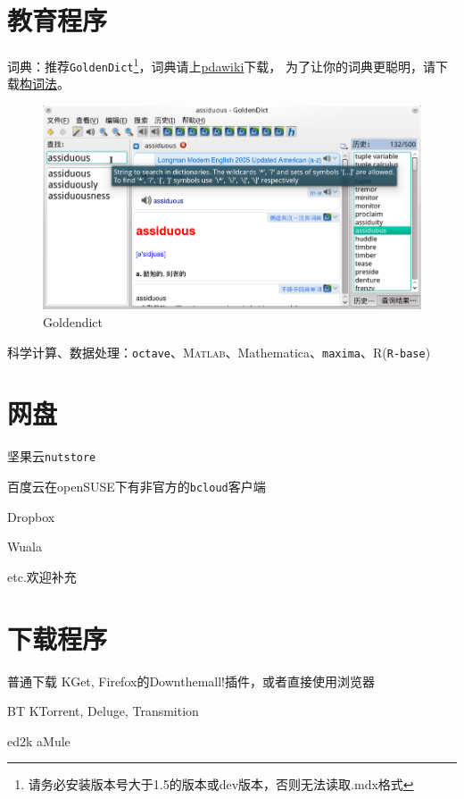 \documentclass[11pt,openany]{book}
\newcommand{\soft}[1]{\texttt{\textcolor{dgreen}{#1}}}
\begin{document}
\section{教育程序}
词典：推荐\soft{GoldenDict}\footnote{请务必安装版本号大于1.5的版本或dev版本，否则无法读取.mdx格式}，词典请上\href{http://pdawiki.com/forum/forum.php}{pdawiki}下载，
为了让你的词典更聪明，请下载\href{https://zpj.blog.ustc.edu.cn/wp-content/uploads/2014/02/wordsrule.tar.gz}{构词法}。
\begin{figure}[htbp]
\centering
\includegraphics[width=\textwidth]{./pic/goldendict.png} 
\caption{Goldendict}\label{goldendict}
\end{figure}
科学计算、数据处理：\soft{octave}、\textsc{Matlab}、Mathematica、\soft{maxima}、R(\soft{R-base})
\section{网盘}
\begin{compactitem}
 \item 坚果云\soft{nutstore}
 \item 百度云在openSUSE下有非官方的\soft{bcloud}客户端
 \item Dropbox
 \item Wuala
 \item etc.欢迎补充
\end{compactitem}

\section{下载程序}
\begin{compactdesc}
 \item[普通下载] KGet, Firefox的Down\-them\-all!插件，或者直接使用浏览器
 \item[BT] KTorrent, Deluge, Transmition
 \item[ed2k] aMule
\end{compactdesc}
\end{document}

